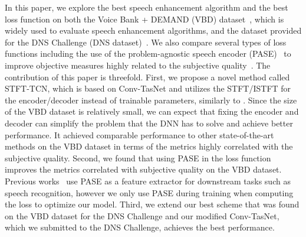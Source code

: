 \documentclass[a4paper]{article}
\begin{document}
\begin{spacing}{0.9}
In this paper, we explore the best speech enhancement algorithm and the best loss function on both the Voice Bank + DEMAND (VBD) dataset~\cite{veaux2013voice,thiemann2013diverse,valentini2016investigating}, which is widely used to evaluate speech enhancement algorithms, and the dataset provided for the DNS Challenge (DNS dataset)~\cite{reddy2020interspeech}. 
We also compare several types of loss functions including the use of the problem-agnostic speech encoder (PASE)~\cite{Pascual2019,ravanelli2020multi}  to improve objective measures highly related to the subjective quality~\cite{hu2007evaluation}.
The contribution of this paper is threefold. 
First, we propose a novel method called STFT-TCN, which is based on Conv-TasNet and utilizes the STFT/ISTFT for the encoder/decoder instead of trainable parameters, similarly to \cite{heitkaemper2019demystifying}. 
Since the size of the VBD dataset is relatively small, we can expect that fixing the encoder and decoder can simplify the problem that the DNN has to solve and achieve better performance. 
It achieved comparable performance to other state-of-the-art methods on the VBD dataset in terms of the metrics highly correlated with the subjective quality. 
Second, we found that using PASE in the loss function improves the metrics correlated with subjective quality on the VBD dataset.  Previous works~\cite{Pascual2019,ravanelli2020multi,Alvarez2019} use PASE as a feature extractor for downstream tasks such as speech recognition, however we only use PASE during training when computing the loss to optimize our model.
Third, we extend our best scheme that was found on the VBD dataset for the DNS Challenge and our modified Conv-TasNet, which we submitted to the DNS Challenge, achieves the best performance.


\vspace{-3mm}
\end{spacing}
\end{document}
